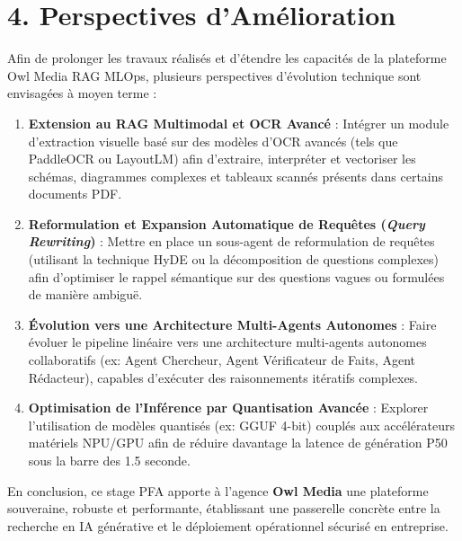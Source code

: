 \section*{4. Perspectives d'Amélioration}
Afin de prolonger les travaux réalisés et d'étendre les capacités de la plateforme Owl Media RAG MLOps, plusieurs perspectives d'évolution technique sont envisagées à moyen terme :
\begin{enumerate}
    \item \textbf{Extension au RAG Multimodal et OCR Avancé} :  
    Intégrer un module d'extraction visuelle basé sur des modèles d'OCR avancés (tels que PaddleOCR ou LayoutLM) afin d'extraire, interpréter et vectoriser les schémas, diagrammes complexes et tableaux scannés présents dans certains documents PDF.
    \item \textbf{Reformulation et Expansion Automatique de Requêtes (\textit{Query Rewriting})} :  
    Mettre en place un sous-agent de reformulation de requêtes (utilisant la technique HyDE ou la décomposition de questions complexes) afin d'optimiser le rappel sémantique sur des questions vagues ou formulées de manière ambiguë.
    \item \textbf{Évolution vers une Architecture Multi-Agents Autonomes} :  
    Faire évoluer le pipeline linéaire vers une architecture multi-agents autonomes collaboratifs (ex: Agent Chercheur, Agent Vérificateur de Faits, Agent Rédacteur), capables d'exécuter des raisonnements itératifs complexes.
    \item \textbf{Optimisation de l'Inférence par Quantisation Avancée} :  
    Explorer l'utilisation de modèles quantisés (ex: GGUF 4-bit) couplés aux accélérateurs matériels NPU/GPU afin de réduire davantage la latence de génération P50 sous la barre des 1.5 seconde.
\end{enumerate}

En conclusion, ce stage PFA apporte à l'agence \textbf{Owl Media} une plateforme souveraine, robuste et performante, établissant une passerelle concrète entre la recherche en IA générative et le déploiement opérationnel sécurisé en entreprise.
